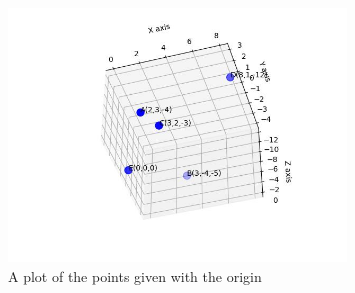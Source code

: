 \documentclass[journal]{IEEEtran}
\begin{document}
\begin{figure}[h]
	\centering
	\includegraphics[width=0.8\textwidth]{figs/figure.jpg}
	\caption{A plot of the points given with the origin}
\end{figure}
\end{document}
